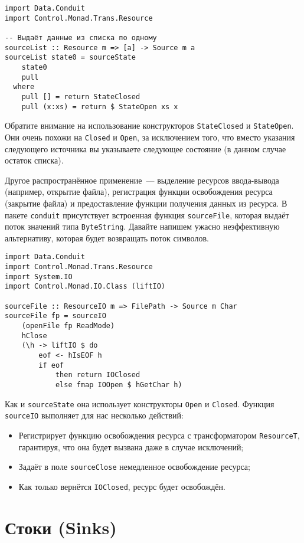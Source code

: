 \begin{lstlisting}
import Data.Conduit
import Control.Monad.Trans.Resource

-- Выдаёт данные из списка по одному
sourceList :: Resource m => [a] -> Source m a
sourceList state0 = sourceState
    state0
    pull
  where
    pull [] = return StateClosed
    pull (x:xs) = return $ StateOpen xs x
\end{lstlisting}

Обратите внимание на использование конструкторов \lstinline=StateClosed= и \lstinline=StateOpen=.
Они очень похожи на
\lstinline=Closed= и \lstinline=Open=, за исключением того, что вместо указания следующего
источника вы указываете следующее состояние (в данном случае остаток списка).

Другое распространённое применение~--- выделение ресурсов ввода-вывода (например,
открытие файла), регистрация функции освобождения ресурса (закрытие файла) и
предоставление функции получения данных из ресурса.
В пакете \texttt{conduit} присутствует встроенная функция \lstinline!sourceFile!, которая выдаёт поток
значений типа \lstinline=ByteString=. Давайте напишем ужасно неэффективную
альтернативу, которая будет возвращать поток символов.

\begin{lstlisting}
import Data.Conduit
import Control.Monad.Trans.Resource
import System.IO
import Control.Monad.IO.Class (liftIO)

sourceFile :: ResourceIO m => FilePath -> Source m Char
sourceFile fp = sourceIO
    (openFile fp ReadMode)
    hClose
    (\h -> liftIO $ do
        eof <- hIsEOF h
        if eof
            then return IOClosed
            else fmap IOOpen $ hGetChar h)
\end{lstlisting}

Как и \lstinline=sourceState= она использует конструкторы \lstinline!Open! и \lstinline!Closed!.
Функция \lstinline=sourceIO= выполняет для нас несколько действий:
\begin{itemize}
 \item Регистрирует функцию освобождения ресурса с трансформатором \lstinline=ResourceT=,
гарантируя, что она будет вызвана даже в случае исключений;
 \item Задаёт в поле \lstinline=sourceClose= немедленное освобождение ресурса;
 \item Как только вернётся \lstinline=IOClosed=, ресурс будет освобождён.
\end{itemize}

\section{Стоки (Sinks)}

